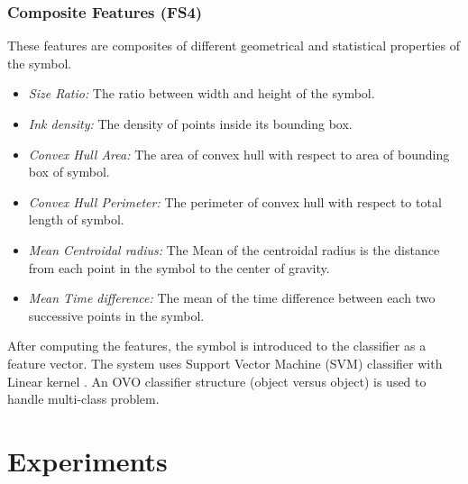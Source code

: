 \documentclass[preprint,1p,times,review]{elsarticle}
\begin{document}
\subsubsection{Composite Features (FS4)}
 These features are composites of different geometrical and statistical
properties of the symbol.
	\begin{itemize}
\item \emph{Size Ratio:} The ratio between width and height of the symbol.
	\item \emph{Ink density:} The density of points inside its bounding
box\cite{GeometryAndDomain102}.
 	\item \emph{Convex Hull Area:} The area of convex hull with respect to
area of bounding box of symbol.
	\item \emph{Convex Hull Perimeter:} The perimeter of convex hull with
respect to total length of symbol.
		\item \emph{Mean Centroidal radius:} The Mean of the centroidal
radius is the distance from each point in the symbol to the center of gravity.
	\item \emph{Mean Time difference:} The mean of the time difference
between each two successive points in the symbol.
  \end{itemize} 
  After computing the features, the symbol is introduced to the classifier as a feature vector. The system uses Support Vector Machine (SVM) classifier with Linear kernel \cite{libsvm}. An OVO classifier structure (object versus object) is used to handle multi-class problem.%

\section{Experiments}
\label{sec:Experiments}
\end{document}

